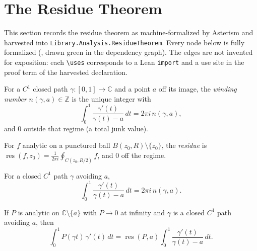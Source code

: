 %

\section{The Residue Theorem}

This section records the residue theorem as machine-formalized by Asterism and harvested into
\texttt{Library.Analysis.ResidueTheorem}. Every node below is fully formalized (\leanok, drawn
green in the dependency graph). The edges are not invented for exposition: each
\texttt{\textbackslash uses} corresponds to a Lean \texttt{import} and a use site in the proof
term of the harvested declaration.

\begin{definition}
  \label{def:winding}
  \leanok
  For a $C^1$ closed path $\gamma : [0,1] \to \mathbb{C}$ and a point $a$ off its image, the
  \emph{winding number} $n(\gamma, a) \in \mathbb{Z}$ is the unique integer with
  \[ \int_0^1 \frac{\gamma'(t)}{\gamma(t) - a}\, dt = 2\pi i\, n(\gamma, a), \]
  and $0$ outside that regime (a total junk value).
\end{definition}

\begin{definition}[Residue]
  \label{def:residue}
  \leanok
  For $f$ analytic on a punctured ball $B(z_0, R) \setminus \{z_0\}$, the \emph{residue} is
  $\operatorname{res}(f, z_0) = \frac{1}{2\pi i} \oint_{C(z_0, R/2)} f$, and $0$ off the
  regime.
\end{definition}

\begin{lemma}
  \label{lem:winding-formula}
  \leanok
  For a closed $C^1$ path $\gamma$ avoiding $a$,
  \[ \int_0^1 \frac{\gamma'(t)}{\gamma(t)-a}\,dt = 2\pi i\, n(\gamma, a). \]
\end{lemma}

\begin{lemma}
  \label{lem:path-residue}
  \leanok
  If $P$ is analytic on $\mathbb{C} \setminus \{a\}$ with $P \to 0$ at infinity and $\gamma$ is
  a closed $C^1$ path avoiding $a$, then
  \[ \int_0^1 P(\gamma t)\,\gamma'(t)\, dt
       = \operatorname{res}(P, a) \int_0^1 \frac{\gamma'(t)}{\gamma(t)-a}\,dt. \]
\end{lemma}

